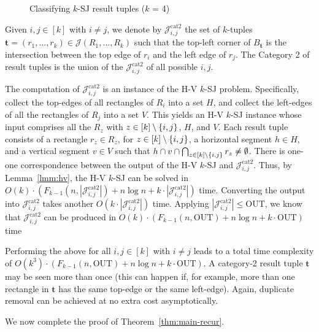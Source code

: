 \documentclass[acmsmall,review,anonymous]{acmart}
\def\vgap{\vspace{1mm}}
\def\extraspacing{\vspace{2mm} \noindent}
\def\figcapup{\vspace{-2mm}}
\def\figcapdown{\vspace{-4mm}}
\def\J{\mathcal{J}}
\def\catt{\mathrm{cat2}}
\def\out{\mathrm{OUT}}
\begin{document}
{{{\begin{figure}
    \figcapup
    \caption{Classifying $k$-SJ result tuples ($k$ = 4)}
    \label{fig:ksj:cats}
    \figcapdown
\end{figure}

\extraspacing {\bf Category 2.} Given $i, j \in [k]$ with $i \ne j$, we denote by $\J^\catt_{i,j}$ the set of $k$-tuples $\bm{t} = (r_1, ..., r_k) \in \J(R_1, ..., R_k)$ such that the top-left corner of $B_\bm{t}$ is the intersection between the top edge of $r_i$ and the left edge of $r_j$. The Category 2 of result tuples is the union of the $\J^\catt_{i,j}$ of all possible $i, j$. 

\vgap 

The computation of $\J^\catt_{i,j}$ is an instance of the H-V $k$-SJ problem. Specifically, collect the top-edges of all rectangles of $R_i$ into a set $H$, and collect the left-edges of all the rectangles of $R_j$ into a set $V$. This yields an H-V $k$-SJ instance whose input comprises all the $R_z$ with $z \in [k] \setminus \{i,j\}$,  $H$, and $V$. Each result tuple consists of a rectangle $r_z \in R_z$, for $z \in [k] \setminus \{i,j\}$, a horizontal segment $h \in H$, and a vertical segment $v \in V$ such that $h \cap v \cap \bigcap_{z \in [k] \setminus \{i,j\}} r_z \ne \emptyset$. There is one-one correspondence between the output of the H-V $k$-SJ and $\J^\catt_{i,j}$. Thus, by Lemma~\ref{lmm:hv}, the H-V $k$-SJ can be solved in $O(k) \cdot (F_{k-1}(n, |\J^\catt_{i,j}|) + n \log n + k \cdot |\J^\catt_{i,j}|)$ time. Converting the output into $\J^\catt_{i,j}$ takes another $O(k \cdot |\J^\catt_{i,j}|)$ time. Applying $|\J^\catt_{i,j}| \le \out$, we know that $\J^\catt_{i,j}$ can be produced in $O(k) \cdot (F_{k-1}(n, \out) + n \log n + k \cdot \out)$ time

\vgap 

Performing the above for all $i, j \in [k]$ with $i \ne j$ leads to a total time complexity of $O(k^3) \cdot (F_{k-1}(n, \out) + n \log n + k \cdot \out)$. A category-2 result tuple $\bm{t}$ may be seen more than once (this can happen if, for example, more than one rectangle in $\bm{t}$ has the same top-edge or the same left-edge). Again, duplicate removal can be achieved at no extra cost asymptotically.

\vgap 

We now complete the proof of Theorem~\ref{thm:main-recur}.




\balance

}}}
\end{document}
